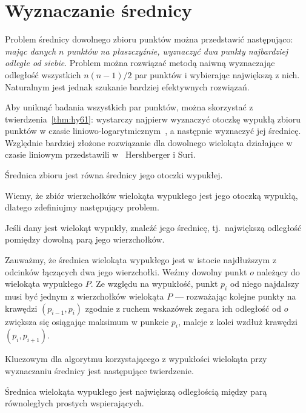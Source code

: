 \chapter{Wyznaczanie średnicy\label{chap:diameter}}
Problem średnicy dowolnego zbioru punktów można przedstawić
następująco: \emph{mając danych $n$ punktów na płaszczyźnie, wyznaczyć
  dwa punkty najbardziej odległe od siebie}. Problem można rozwiązać
metodą naiwną wyznaczając odległość wszystkich $n(n-1)/2$ par punktów
i wybierając największą z nich. Naturalnym jest jednak szukanie
bardziej efektywnych rozwiązań.

Aby uniknąć badania wszystkich par punktów, można skorzystać z
twierdzenia~\ref{thm:hy61}: wystarczy najpierw wyznaczyć otoczkę
wypukłą zbioru punktów w czasie
liniowo-logarytmicznym~\cite{Graham72}, a następnie wyznaczyć jej
średnicę. Względnie bardziej złożone rozwiązanie dla dowolnego
wielokąta działające w czasie liniowym przedstawili w~\cite{Hersh93}
Hershberger i Suri.

\begin{twierdzenie}
  Średnica zbioru jest równa średnicy jego otoczki wypukłej.
\end{twierdzenie}

Wiemy, że zbiór wierzchołków wielokąta wypukłego jest jego otoczką
wypukłą, dlatego zdefiniujmy następujący problem.

\begin{problem}
  Jeśli dany jest wielokąt wypukły, znaleźć jego średnicę,
  tj.\ największą odległość pomiędzy dowolną parą jego wierzchołków.
\end{problem}

Zauważmy, że średnica wielokąta wypukłego jest w istocie najdłuższym z
odcinków łączących dwa jego wierzchołki. Weźmy dowolny punkt $o$
należący do wielokąta wypukłego $P$. Ze względu na wypukłość, punkt
$p_i$ od niego najdalszy musi być jednym z wierzchołków wielokąta $P$
--- rozważając kolejne punkty na krawędzi $(p_{i-1}, p_i)$ zgodnie z
ruchem wskazówek zegara ich odległość od $o$ zwiększa się osiągając
maksimum w punkcie $p_i$, maleje z kolei wzdłuż krawędzi $(p_i,
p_{i+1})$.

Kluczowym dla algorytmu korzystającego z wypukłości wielokąta przy
wyznaczaniu średnicy jest następujące twierdzenie.

\begin{twierdzenie}
\label{thm:yagbol}
  Średnica wielokąta wypukłego jest największą odległością między parą
  równoległych prostych wspierających.
\end{twierdzenie}

